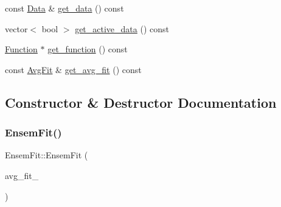 \begin{DoxyCompactItemize}
\item 
const \mbox{\hyperlink{classData}{Data}} \& \mbox{\hyperlink{classEnsemFit_a3015ab1126ad56869931c3ee6e5f054f}{get\+\_\+data}} () const
\item 
vector$<$ bool $>$ \mbox{\hyperlink{classEnsemFit_a562d0418f52bf3491752e53a1f65f13b}{get\+\_\+active\+\_\+data}} () const
\item 
\mbox{\hyperlink{classFunction}{Function}} $\ast$ \mbox{\hyperlink{classEnsemFit_a0731f0c71cd1b0b6c9d26ebff9cc3620}{get\+\_\+function}} () const
\item 
const \mbox{\hyperlink{classAvgFit}{Avg\+Fit}} \& \mbox{\hyperlink{classEnsemFit_ad84c2ab3c1bce4d11140ff275acd27ae}{get\+\_\+avg\+\_\+fit}} () const
\end{DoxyCompactItemize}


\subsection{Constructor \& Destructor Documentation}
\mbox{\label{classEnsemFit_ae8fc27d065976ce4b2a357b457e7755d}} 
\subsubsection{\texorpdfstring{EnsemFit()}{EnsemFit()}\hspace{0.1cm}{\footnotesize\ttfamily [1/2]}}
{\footnotesize\ttfamily Ensem\+Fit\+::\+Ensem\+Fit (\begin{DoxyParamCaption}\item[{const \mbox{\hyperlink{classAvgFit}{Avg\+Fit}} \&}]{avg\+\_\+fit\+\_\+ }\end{DoxyParamCaption})}

